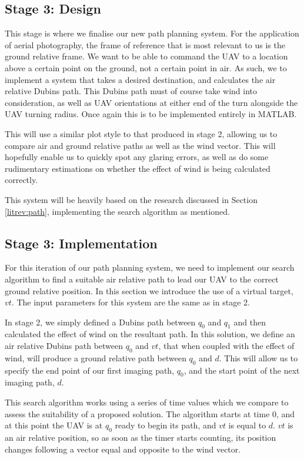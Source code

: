 \subsection{Stage 3: Design}
\label{task1:stage3:design}


This stage is where we finalise our new path planning system. For the application of aerial photography, the frame of reference that is most relevant to us is the ground relative frame. We want to be able to command the UAV to a location above a certain point on the ground, not a certain point in air. As such, we to implement a system that takes a desired destination, and calculates the air relative Dubins path. This Dubins path must of course take wind into consideration, as well as UAV orientations at either end of the turn alongside the UAV turning radius. Once again this is to be implemented entirely in MATLAB. 

This will use a similar plot style to that produced in stage 2, allowing us to compare air and ground relative paths as well as the wind vector. This will hopefully enable us to quickly spot any glaring errors, as well as do some rudimentary estimations on whether the effect of wind is being calculated correctly.

This system will be heavily based on the research discussed in Section \ref{litrev:path}, implementing the search algorithm as mentioned.

\subsection{Stage 3: Implementation}
\label{task1:stage3:implementation}

For this iteration of our path planning system, we need to implement our search algorithm to find a suitable air relative path to lead our UAV to the correct ground relative position. In this section we introduce the use of a virtual target, $vt$. The input parameters for this system are the same as in stage 2. 

In stage 2, we simply defined a Dubins path between $q_0$ and $q_1$ and then calculated the effect of wind on the resultant path. In this solution, we define an air relative Dubins path between $q_0$ and $vt$, that when coupled with the effect of wind, will produce a ground relative path between $q_0$ and $d$. This will allow us to specify the end point of our first imaging path, $q_0$, and the start point of the next imaging path, $d$. 

This search algorithm works using a series of time values which we compare to assess the suitability of a proposed solution. The algorithm starts at time 0, and at this point the UAV is at $q_0$ ready to begin its path, and $vt$ is equal to $d$. $vt$ is an air relative position, so as soon as the timer starts counting, its position changes following a vector equal and opposite to the wind vector. 

